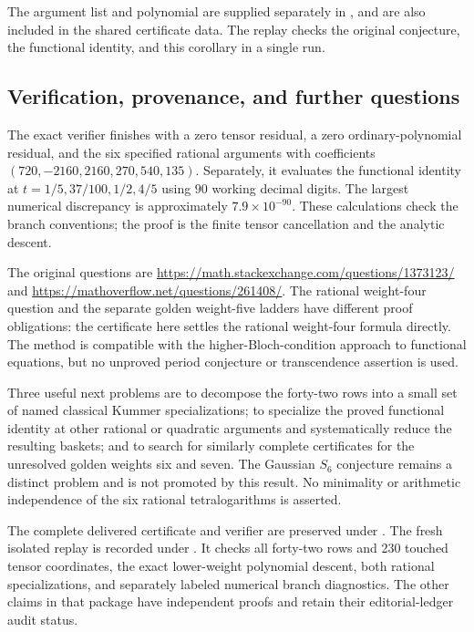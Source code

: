 The argument list and polynomial are supplied separately in
, and are also included in the
shared certificate data. The replay checks the original conjecture,
the functional identity, and this corollary in a single run.

\subsection{Verification, provenance, and further questions}

The exact verifier finishes with a zero tensor residual, a zero
ordinary-polynomial residual, and the six specified rational arguments
with coefficients $(720,-2160,2160,270,540,135)$. Separately, it evaluates
the functional identity at $t=1/5,37/100,1/2,4/5$ using $90$ working
decimal digits. The largest numerical discrepancy is approximately
$7.9\times10^{-90}$. These calculations check the branch conventions;
the proof is the finite tensor cancellation and the analytic descent.

The original questions are
\url{https://math.stackexchange.com/questions/1373123/} and
\url{https://mathoverflow.net/questions/261408/}.
The rational weight-four question and the separate golden weight-five
ladders have different proof obligations: the certificate here settles the rational
weight-four formula directly. The method is compatible with the
higher-Bloch-condition approach to functional equations, but no unproved
period conjecture or transcendence assertion is used.

Three useful next problems are to decompose the forty-two rows into a
small set of named classical Kummer specializations; to specialize the
proved functional identity at other rational or quadratic arguments and
systematically reduce the resulting baskets; and to search for similarly
complete certificates for the unresolved golden weights six and seven.
The Gaussian $S_6$ conjecture remains a distinct problem and is not
promoted by this result. No minimality or arithmetic independence of
the six rational tetralogarithms is asserted.

The complete delivered certificate and verifier are preserved under
.
The fresh isolated replay is recorded under
. It checks all forty-two rows and
230 touched tensor coordinates, the exact lower-weight polynomial descent,
both rational specializations, and separately labeled numerical branch
diagnostics. The other claims in that package have independent proofs and
retain their editorial-ledger audit status.
